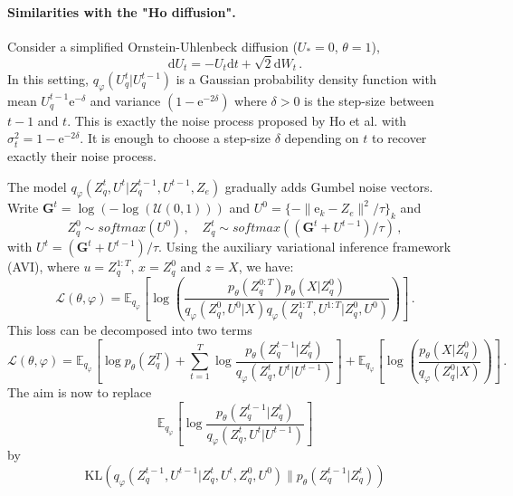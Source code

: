 \documentclass{article}
\newcommand{\rme}{\mathrm{e}}
\begin{document}
\paragraph{Similarities with the "Ho diffusion". }
Consider a simplified Ornstein-Uhlenbeck diffusion ($U_* = 0$, $\theta = 1$),
$$
\mathrm{d}U_t = -U_t\mathrm{d}t + \sqrt{2}\mathrm{d}W_t\,.
$$
 In this setting, $q_\varphi(U_q^{t}|U_q^{t-1})$ is a Gaussian probability density function with mean $U_q^{t-1}\mathrm{e}^{-\delta}$ and variance $(1-\mathrm{e}^{-2\delta})$ where $\delta>0$ is the step-size between $t-1$ and $t$. This is exactly the noise process proposed by Ho et al. with $\sigma^2_t = 1 - \mathrm{e}^{-2\delta}$. It is enough to choose a step-size $\delta$ depending on  $t$ to recover exactly their noise process.

\clearpage
\newpage


The model $q_{\varphi}(Z_q^t ,U^t| Z_q^{t-1},U^{t-1}, Z_e)$ gradually adds Gumbel noise vectors. Write  $\mathbf{G}^t = \log(-\log(\mathcal{U}(0,1)))$ and $U^0 = \{- \| \rme_k - Z_e\|^2/ \tau\}_k $ and 
$$
Z_q^0 \sim softmax(U^0 )\,, \quad Z_q^t \sim softmax((\mathbf{G}^t +U^{t-1}) / \tau)\,,
$$
with $U^t = (\mathbf{G}^t +U^{t-1}) / \tau$. Using the auxiliary variational inference framework (AVI), where $u = Z_q^{1:T}$, $x = Z_q^0$ and $z = X$, we have:
$$
\mathcal{L}(\theta, \varphi) = \mathbb{E}_{q_\varphi} \left[ \log\left(\frac{p_\theta(Z_q^{0:T})p_\theta(X|Z_q^0)}{q_\varphi(Z_q^0,U^0|X) q_\varphi(Z_q^{1:T},U^{1:T}|Z_q^0,U^0)}\right) \right]\,.
$$
This loss can be decomposed into two terms
$$
\mathcal{L}(\theta, \varphi) = \mathbb{E}_{q_\varphi} \left[\log p_\theta(Z_q^T) + \sum_{t=1}^T\log  \frac{p_\theta(Z_q^{t-1}|Z_q^t)}{q_\varphi(Z_q^{t},U^t|U^{t-1})} \right] + \mathbb{E}_{q_\varphi} \left[ \log\left(\frac{p_\theta(X|Z_q^0)}{q_\varphi(Z_q^0|X)}\right) \right]\,.
$$
The aim is now to replace 
$$
 \mathbb{E}_{q_\varphi} \left[\log  \frac{p_\theta(Z_q^{t-1}|Z_q^t)}{q_\varphi(Z_q^{t},U^t|U^{t-1})} \right]
$$
by
$$
\mathrm{KL}(q_\varphi(Z_q^{t-1},U^{t-1}|Z_q^t,U^{t},Z_q^0,U^{0})\|p_\theta(Z_q^{t-1}|Z_q^t))
$$
\clearpage
\newpage
\end{document}
